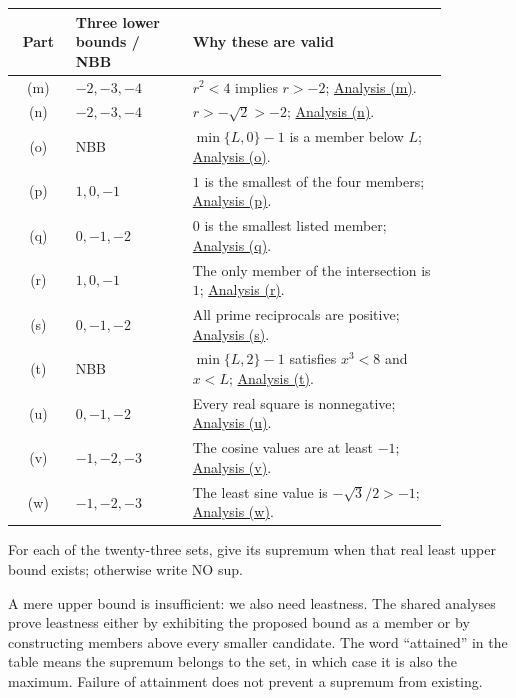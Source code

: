 \begin{center}
\begin{tabular}{@{}c@{\quad}p{0.27\linewidth}@{\quad}p{0.59\linewidth}@{}}
\toprule
Part&Three lower bounds / NBB&Why these are valid\\ \midrule
(m)&$-2,-3,-4$&$r^2<4$ implies $r>-2$; \hyperref[bounds:m]{Analysis (m)}.\\
(n)&$-2,-3,-4$&$r>-\sqrt2>-2$; \hyperref[bounds:n]{Analysis (n)}.\\
(o)&NBB&$\min\{L,0\}-1$ is a member below $L$; \hyperref[bounds:o]{Analysis (o)}.\\
(p)&$1,0,-1$&$1$ is the smallest of the four members; \hyperref[bounds:p]{Analysis (p)}.\\
(q)&$0,-1,-2$&$0$ is the smallest listed member; \hyperref[bounds:q]{Analysis (q)}.\\
(r)&$1,0,-1$&The only member of the intersection is $1$; \hyperref[bounds:r]{Analysis (r)}.\\
(s)&$0,-1,-2$&All prime reciprocals are positive; \hyperref[bounds:s]{Analysis (s)}.\\
(t)&NBB&$\min\{L,2\}-1$ satisfies $x^3<8$ and $x<L$; \hyperref[bounds:t]{Analysis (t)}.\\
(u)&$0,-1,-2$&Every real square is nonnegative; \hyperref[bounds:u]{Analysis (u)}.\\
(v)&$-1,-2,-3$&The cosine values are at least $-1$; \hyperref[bounds:v]{Analysis (v)}.\\
(w)&$-1,-2,-3$&The least sine value is $-\sqrt3/2>-1$; \hyperref[bounds:w]{Analysis (w)}.\\
\bottomrule
\end{tabular}
\end{center}



\goal For each of the twenty-three sets, give its supremum when
that real least upper bound exists; otherwise write NO sup.

\idea A mere upper bound is insufficient: we also need leastness.
The shared analyses prove leastness either by exhibiting the proposed
bound as a member or by constructing members above every smaller
candidate. The word ``attained'' in the table means the supremum
belongs to the set, in which case it is also the maximum. Failure
of attainment does not prevent a supremum from existing.

